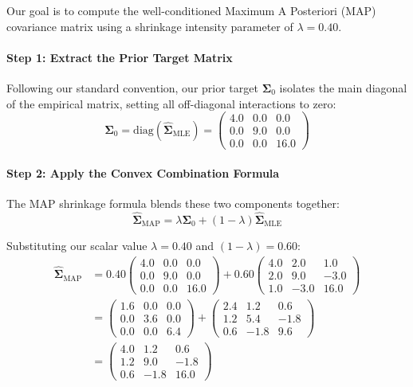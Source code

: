 \documentclass{article}
\begin{document}
Our goal is to compute the well-conditioned Maximum A Posteriori ($\text{MAP}$) covariance matrix using a shrinkage intensity parameter of $\lambda = 0.40$.

\paragraph{Step 1: Extract the Prior Target Matrix}
Following our standard convention, our prior target $\boldsymbol{\Sigma}_0$ isolates the main diagonal of the empirical matrix, setting all off-diagonal interactions to zero:
\begin{equation}
\boldsymbol{\Sigma}_0 = \text{diag}(\hat{\boldsymbol{\Sigma}}_{\text{MLE}}) = \begin{pmatrix} 4.0 & 0.0 & 0.0 \\ 0.0 & 9.0 & 0.0 \\ 0.0 & 0.0 & 16.0 \end{pmatrix}
\end{equation}

\paragraph{Step 2: Apply the Convex Combination Formula}
The MAP shrinkage formula blends these two components together:
\begin{equation}
\hat{\boldsymbol{\Sigma}}_{\text{MAP}} = \lambda \boldsymbol{\Sigma}_0 + (1 - \lambda)\hat{\boldsymbol{\Sigma}}_{\text{MLE}}
\end{equation}

Substituting our scalar value $\lambda = 0.40$ and $(1 - \lambda) = 0.60$:
\begin{align}
\hat{\boldsymbol{\Sigma}}_{\text{MAP}} &= 0.40 \begin{pmatrix} 4.0 & 0.0 & 0.0 \\ 0.0 & 9.0 & 0.0 \\ 0.0 & 0.0 & 16.0 \end{pmatrix} + 0.60 \begin{pmatrix} 4.0 & 2.0 & 1.0 \\ 2.0 & 9.0 & -3.0 \\ 1.0 & -3.0 & 16.0 \end{pmatrix} \\[3mm]
&= \begin{pmatrix} 1.6 & 0.0 & 0.0 \\ 0.0 & 3.6 & 0.0 \\ 0.0 & 0.0 & 6.4 \end{pmatrix} + \begin{pmatrix} 2.4 & 1.2 & 0.6 \\ 1.2 & 5.4 & -1.8 \\ 0.6 & -1.8 & 9.6 \end{pmatrix} \\[3mm]
&= \begin{pmatrix} 4.0 & 1.2 & 0.6 \\ 1.2 & 9.0 & -1.8 \\ 0.6 & -1.8 & 16.0 \end{pmatrix}
\end{align}
\end{document}
